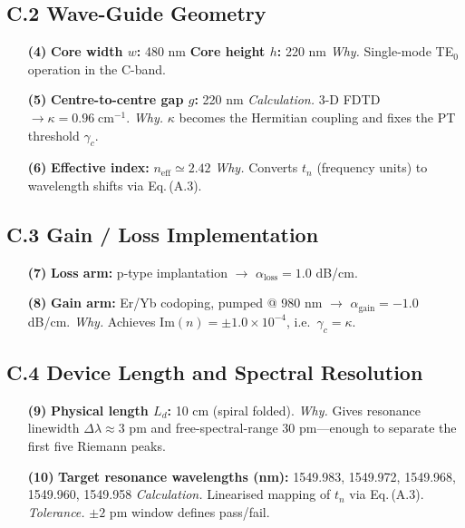 \documentclass[11pt]{article}
\begin{document}
\subsection*{C.2  Wave-Guide Geometry}
\begin{enumerate}
\item[\textbf{(4)}] \textbf{Core width $w$:} 480 nm \;\;
      \textbf{Core height $h$:} 220 nm  
      \textit{Why.}  Single-mode TE$_0$ operation in the C-band.

\item[\textbf{(5)}] \textbf{Centre-to-centre gap $g$:} 220 nm  
      \textit{Calculation.}  3-D FDTD $\rightarrow \kappa = 0.96\;\text{cm}^{-1}$.  
      \textit{Why.}  $\kappa$ becomes the Hermitian coupling and fixes the PT threshold $\gamma_c$.

\item[\textbf{(6)}] \textbf{Effective index:} $n_{\text{eff}} \simeq 2.42$  
      \textit{Why.}  Converts $t_n$ (frequency units) to wavelength shifts via Eq.\,(A.3).
\end{enumerate}

\vspace{0.6em}
\subsection*{C.3  Gain / Loss Implementation}
\begin{enumerate}
\item[\textbf{(7)}] \textbf{Loss arm:} p-type implantation \(\rightarrow\) $\alpha_\text{loss}=1.0$ dB/cm.  
\item[\textbf{(8)}] \textbf{Gain arm:} Er/Yb codoping, pumped @ 980 nm \(\rightarrow\) $\alpha_\text{gain}=-1.0$ dB/cm.  
      \textit{Why.}  Achieves $\mathrm{Im}(n)=\pm 1.0\times10^{-4}$, i.e.\ $\gamma_c=\kappa$.
\end{enumerate}

\vspace{0.6em}
\subsection*{C.4  Device Length and Spectral Resolution}
\begin{enumerate}
\item[\textbf{(9)}] \textbf{Physical length $L_d$:} 10 cm (spiral folded).  
      \textit{Why.}  Gives resonance linewidth $\Delta\lambda\approx3$ pm and free-spectral-range 30 pm—enough to separate the first five Riemann peaks.

\item[\textbf{(10)}] \textbf{Target resonance wavelengths (nm):}  
      1549.983, 1549.972, 1549.968, 1549.960, 1549.958  
      \textit{Calculation.}  Linearised mapping of $t_n$ via Eq.\,(A.3).  
      \textit{Tolerance.}  $\pm2$ pm window defines pass/fail.
\end{enumerate}
\end{document}
